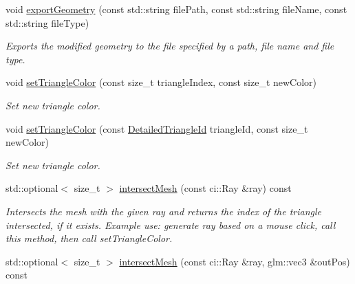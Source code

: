 \begin{DoxyCompactItemize}
\mbox{\label{classpepr3d_1_1_geometry_af8106be97900d3fa8a39d0dfb4603ae0}} 
void \mbox{\hyperlink{classpepr3d_1_1_geometry_af8106be97900d3fa8a39d0dfb4603ae0}{export\+Geometry}} (const std\+::string file\+Path, const std\+::string file\+Name, const std\+::string file\+Type)
\begin{DoxyCompactList}\small\item\em Exports the modified geometry to the file specified by a path, file name and file type. \end{DoxyCompactList}\item 
void \mbox{\hyperlink{classpepr3d_1_1_geometry_aa473f80280346656024fc494994c065e}{set\+Triangle\+Color}} (const size\+\_\+t triangle\+Index, const size\+\_\+t new\+Color)
\begin{DoxyCompactList}\small\item\em Set new triangle color. \end{DoxyCompactList}\item 
\mbox{\label{classpepr3d_1_1_geometry_a0a8c000a3009ae4372ce223b27765ae6}} 
void \mbox{\hyperlink{classpepr3d_1_1_geometry_a0a8c000a3009ae4372ce223b27765ae6}{set\+Triangle\+Color}} (const \mbox{\hyperlink{structpepr3d_1_1_detailed_triangle_id}{Detailed\+Triangle\+Id}} triangle\+Id, const size\+\_\+t new\+Color)
\begin{DoxyCompactList}\small\item\em Set new triangle color. \end{DoxyCompactList}\item 
std\+::optional$<$ size\+\_\+t $>$ \mbox{\hyperlink{classpepr3d_1_1_geometry_ace58dc7a4182240000e9b773cb8da4ee}{intersect\+Mesh}} (const ci\+::\+Ray \&ray) const
\begin{DoxyCompactList}\small\item\em Intersects the mesh with the given ray and returns the index of the triangle intersected, if it exists. Example use\+: generate ray based on a mouse click, call this method, then call set\+Triangle\+Color. \end{DoxyCompactList}\item 
\mbox{\label{classpepr3d_1_1_geometry_a039de87ce062281b93132481ca7ddba8}} 
std\+::optional$<$ size\+\_\+t $>$ \mbox{\hyperlink{classpepr3d_1_1_geometry_a039de87ce062281b93132481ca7ddba8}{intersect\+Mesh}} (const ci\+::\+Ray \&ray, glm\+::vec3 \&out\+Pos) const

\end{DoxyCompactItemize}
